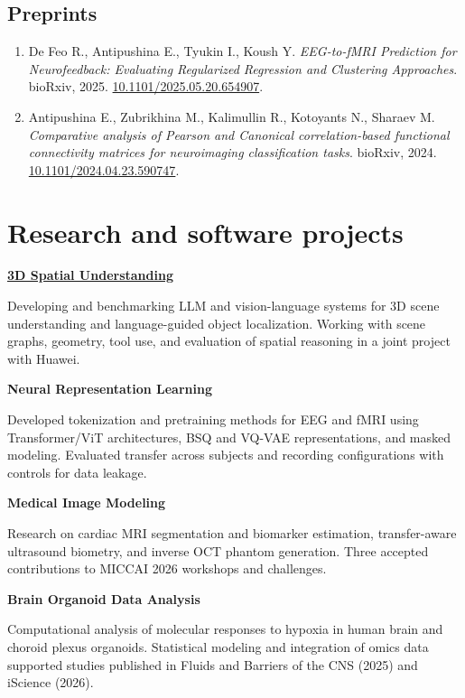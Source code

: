 \documentclass[10pt,a4paper]{article}
\begin{document}
\subsection*{Preprints}
\begin{enumerate}
\item De Feo R., Antipushina E., Tyukin I., Koush Y. \textit{EEG-to-fMRI Prediction for Neurofeedback: Evaluating Regularized Regression and Clustering Approaches}. bioRxiv, 2025. \href{https://doi.org/10.1101/2025.05.20.654907}{10.1101/2025.05.20.654907}.
\item Antipushina E., Zubrikhina M., Kalimullin R., Kotoyants N., Sharaev M. \textit{Comparative analysis of Pearson and Canonical correlation-based functional connectivity matrices for neuroimaging classification tasks}. bioRxiv, 2024. \href{https://doi.org/10.1101/2024.04.23.590747}{10.1101/2024.04.23.590747}.
\end{enumerate}
\endgroup\newpage\section{Research and software projects}
\begingroup\fontsize{10.2}{12.5}\selectfont
\textbf{\href{https://utoprey.github.io/experience/EkaterinaAntipushinaCV.pdf}{3D Spatial Understanding}}\par Developing and benchmarking LLM and vision-language systems for 3D scene understanding and language-guided object localization. Working with scene graphs, geometry, tool use, and evaluation of spatial reasoning in a joint project with Huawei.\par\vspace{5pt}
\textbf{Neural Representation Learning}\par Developed tokenization and pretraining methods for EEG and fMRI using Transformer/ViT architectures, BSQ and VQ-VAE representations, and masked modeling. Evaluated transfer across subjects and recording configurations with controls for data leakage.\par\vspace{5pt}
\textbf{Medical Image Modeling}\par Research on cardiac MRI segmentation and biomarker estimation, transfer-aware ultrasound biometry, and inverse OCT phantom generation. Three accepted contributions to MICCAI 2026 workshops and challenges.\par\vspace{5pt}
\textbf{Brain Organoid Data Analysis}\par Computational analysis of molecular responses to hypoxia in human brain and choroid plexus organoids. Statistical modeling and integration of omics data supported studies published in Fluids and Barriers of the CNS (2025) and iScience (2026).\par\vspace{5pt}
\end{document}
